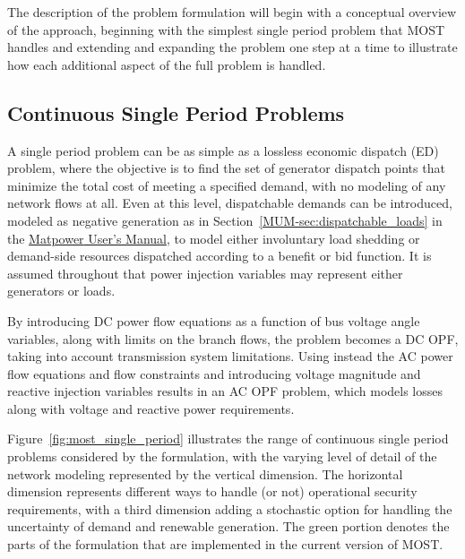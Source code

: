 \documentclass[12pt]{article}
\newcommand{\mpver}[0]{6.0}
\newcommand{\matpower}[0]{{\sc Matpower}}
\newcommand{\most}[0]{{MOST}}
\newcommand{\mumurl}[0]{http://www.pserc.cornell.edu/matpower/docs/MATPOWER-manual-\mpver.pdf}
\newcommand{\mum}[0]{\href{\mumurl}{\matpower{} User's Manual}}
\numberwithin{equation}{section}
\numberwithin{table}{section}
\numberwithin{figure}{section}
\begin{document}
The description of the problem formulation will begin with a conceptual overview of the approach, beginning with the simplest single period problem that \most{} handles and extending and expanding the problem one step at a time to illustrate how each additional aspect of the full problem is handled.

\subsection{Continuous Single Period Problems}

A single period problem can be as simple as a lossless economic dispatch (ED) problem, where the objective is to find the set of generator dispatch points that minimize the total cost of meeting a specified demand, with no modeling of any network flows at all. Even at this level, dispatchable demands can be introduced, modeled as negative generation as in Section~\ref{MUM-sec:dispatchable_loads} in the \mum{}, to model either involuntary load shedding or demand-side resources dispatched according to a benefit or bid function. It is assumed throughout that power injection variables may represent either generators or loads.

By introducing DC power flow equations as a function of bus voltage angle variables, along with limits on the branch flows, the problem becomes a DC OPF, taking into account transmission system limitations. Using instead the AC power flow equations and flow constraints and introducing voltage magnitude and reactive injection variables results in an AC OPF problem, which models losses along with voltage and reactive power requirements.

Figure~\ref{fig:most_single_period} illustrates the range of continuous single period problems considered by the formulation, with the varying level of detail of the network modeling represented by the vertical dimension. The horizontal dimension represents different ways to handle (or not) operational security requirements, with a third dimension adding a stochastic option for handling the uncertainty of demand and renewable generation. The green portion denotes the parts of the formulation that are implemented in the current version of \most{}.
\end{document}
